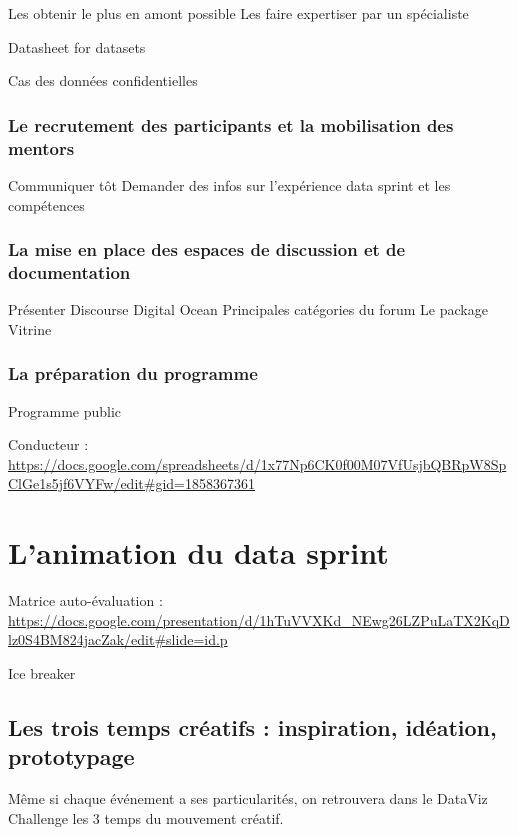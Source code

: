 \documentclass[]{book}
\begin{document}
Les obtenir le plus en amont possible Les faire expertiser par un
spécialiste

Datasheet for datasets

Cas des données confidentielles

\subsection{Le recrutement des participants et la mobilisation des
mentors}\label{le-recrutement-des-participants-et-la-mobilisation-des-mentors}

Communiquer tôt Demander des infos sur l'expérience data sprint et les
compétences

\subsection{La mise en place des espaces de discussion et de
documentation}\label{la-mise-en-place-des-espaces-de-discussion-et-de-documentation}

Présenter Discourse Digital Ocean Principales catégories du forum Le
package Vitrine

\subsection{La préparation du
programme}\label{la-preparation-du-programme}

Programme public

Conducteur :
\url{https://docs.google.com/spreadsheets/d/1x77Np6CK0f00M07VfUsjbQBRpW8SpClGe1s5jf6VYFw/edit\#gid=1858367361}

\chapter{L'animation du data sprint}\label{animation}

Matrice auto-évaluation :
\url{https://docs.google.com/presentation/d/1hTuVVXKd_NEwg26LZPuLaTX2KqDlz0S4BM824jacZak/edit\#slide=id.p}

Ice breaker

\section{Les trois temps créatifs : inspiration, idéation,
prototypage}\label{les-trois-temps-creatifs-inspiration-ideation-prototypage}

Même si chaque événement a ses particularités, on retrouvera dans le
DataViz Challenge les 3 temps du mouvement créatif.
\end{document}
